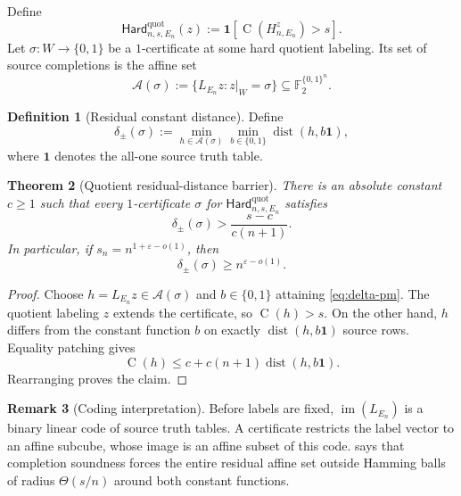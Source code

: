 \documentclass[11pt]{article}
\newtheorem{theorem}{Theorem}[section]
\theoremstyle{definition}
\newtheorem{definition}[theorem]{Definition}
\newtheorem{remark}[theorem]{Remark}
\newcommand{\bits}{\{0,1\}}
\newcommand{\F}{\mathbb{F}_2}
\newcommand{\Ckt}{\operatorname{C}}
\newcommand{\dist}{\operatorname{dist}}
\newcommand{\eps}{\varepsilon}
\newcommand{\HardQ}{\mathsf{Hard}^{\mathrm{quot}}}
\begin{document}
Define
\[
  \HardQ_{n,s,E_n}(z)
  :=\mathbf 1[\Ckt(H_{n,E_n}^{z})>s].
\]
Let $\sigma:W\to\bits$ be a $1$-certificate at some hard quotient labeling.  Its set of source completions is the affine set
\begin{equation}\label{eq:affine-completions}
  \mathcal A(\sigma)
  :=\{L_{E_n}z:z|_W=\sigma\}
  \subseteq\F^{\bits^n}.
\end{equation}

\begin{definition}[Residual constant distance]\label{def:residual-distance}
Define
\begin{equation}\label{eq:delta-pm}
  \delta_{\pm}(\sigma)
  :=\min_{h\in\mathcal A(\sigma)}
      \min_{b\in\bits}\dist(h,b\mathbf 1),
\end{equation}
where $\mathbf 1$ denotes the all-one source truth table.
\end{definition}

\begin{theorem}[Quotient residual-distance barrier]\label{thm:quotient-distance}
There is an absolute constant $c\ge1$ such that every $1$-certificate $\sigma$ for $\HardQ_{n,s,E_n}$ satisfies
\begin{equation}\label{eq:quotient-distance}
  \delta_{\pm}(\sigma)
  >\frac{s-c}{c(n+1)}.
\end{equation}
In particular, if $s_n=n^{1+\eps-o(1)}$, then
\[
  \delta_{\pm}(\sigma)\ge n^{\eps-o(1)}.
\]
\end{theorem}

\begin{proof}
Choose $h=L_{E_n}z\in\mathcal A(\sigma)$ and $b\in\bits$ attaining \eqref{eq:delta-pm}.  The quotient labeling $z$ extends the certificate, so $\Ckt(h)>s$.  On the other hand, $h$ differs from the constant function $b$ on exactly $\dist(h,b\mathbf 1)$ source rows.  Equality patching gives
\[
  \Ckt(h)
  \le c+c(n+1)\dist(h,b\mathbf 1).
\]
Rearranging proves the claim.
\end{proof}

\begin{remark}[Coding interpretation]\label{rem:coding}
Before labels are fixed, $\operatorname{im}(L_{E_n})$ is a binary linear code of source truth tables.  A certificate restricts the label vector to an affine subcube, whose image is an affine subset of this code.   says that completion soundness forces the entire residual affine set outside Hamming balls of radius $\Theta(s/n)$ around both constant functions.
\end{remark}
\end{document}
